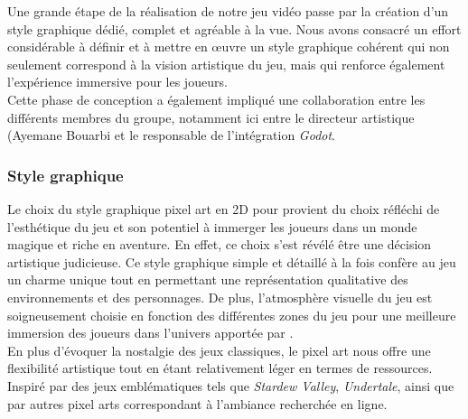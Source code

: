 

Une grande étape de la réalisation de notre jeu vidéo passe par la création d'un style graphique dédié, complet et agréable à la vue.
Nous avons consacré un effort considérable à définir et à mettre en œuvre un style graphique cohérent qui non seulement correspond à la vision artistique du jeu, mais qui renforce également l'expérience immersive pour les joueurs.
\\

Cette phase de conception a également impliqué une collaboration entre les différents membres du groupe, notamment ici entre le directeur artistique (Ayemane Bouarbi et le responsable de l'intégration \textit{Godot}.


\subsubsection*{\hspace*{0.6cm}Style graphique}

Le choix du style graphique pixel art en 2D pour \gameName provient du choix réfléchi de l'esthétique du jeu et son potentiel à immerger les joueurs dans un monde magique et riche en aventure.
En effet, ce choix s'est révélé être une décision artistique judicieuse.
Ce style graphique simple et détaillé à la fois confère au jeu un charme unique tout en permettant une représentation qualitative des environnements et des personnages.
De plus, l'atmosphère visuelle du jeu est soigneusement choisie en fonction des différentes zones du jeu pour une meilleure immersion des joueurs dans l'univers apportée par \gameName.
\\

En plus d'évoquer la nostalgie des jeux classiques, le pixel art nous offre une flexibilité artistique tout en étant relativement léger en termes de ressources.
Inspiré par des jeux emblématiques tels que \textit{Stardew Valley}, \textit{Undertale}, ainsi que par autres pixel arts correspondant à l'ambiance recherchée en ligne.

